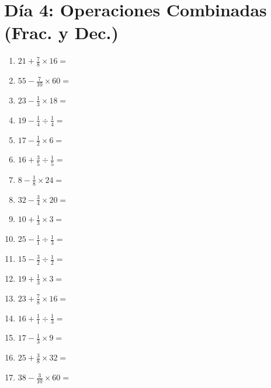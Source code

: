 \documentclass[12pt]{article}
\begin{document}
\section*{Día 4: Operaciones Combinadas (Frac. y Dec.)}
\begin{enumerate}
\item \large $ 21 + \frac{7}{8} \times 16 = $ \vspace{1.6cm}
\item \large $ 55 - \frac{7}{10} \times 60 = $ \vspace{1.6cm}
\item \large $ 23 - \frac{1}{3} \times 18 = $ \vspace{1.6cm}
\item \large $ 19 - \frac{1}{4} \div \frac{1}{4} = $ \vspace{1.6cm}
\item \large $ 17 - \frac{1}{2} \times 6 = $ \vspace{1.6cm}
\item \large $ 16 + \frac{3}{5} \div \frac{1}{5} = $ \vspace{1.6cm}
\item \large $ 8 - \frac{1}{8} \times 24 = $ \vspace{1.6cm}
\item \large $ 32 - \frac{3}{4} \times 20 = $ \vspace{1.6cm}
\item \large $ 10 + \frac{1}{3} \times 3 = $ \vspace{1.6cm}
\item \large $ 25 - \frac{1}{1} \div \frac{1}{3} = $ \vspace{1.6cm}
\newpage
\item \large $ 15 - \frac{3}{2} \div \frac{1}{2} = $ \vspace{1.6cm}
\item \large $ 19 + \frac{1}{3} \times 3 = $ \vspace{1.6cm}
\item \large $ 23 + \frac{7}{8} \times 16 = $ \vspace{1.6cm}
\item \large $ 16 + \frac{1}{1} \div \frac{1}{3} = $ \vspace{1.6cm}
\item \large $ 17 - \frac{1}{3} \times 9 = $ \vspace{1.6cm}
\item \large $ 25 + \frac{3}{8} \times 32 = $ \vspace{1.6cm}
\item \large $ 38 - \frac{3}{10} \times 60 = $ \vspace{1.6cm}

\end{enumerate}
\end{document}
